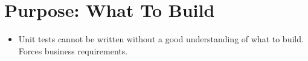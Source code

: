 \documentclass{article}
\begin{document}
\sloppy
\section{Purpose: What To Build}
\begin{itemize}
    \item Unit tests cannot be written without a good understanding of what to
        build. Forces business requirements.
\end{itemize}
\end{document}

